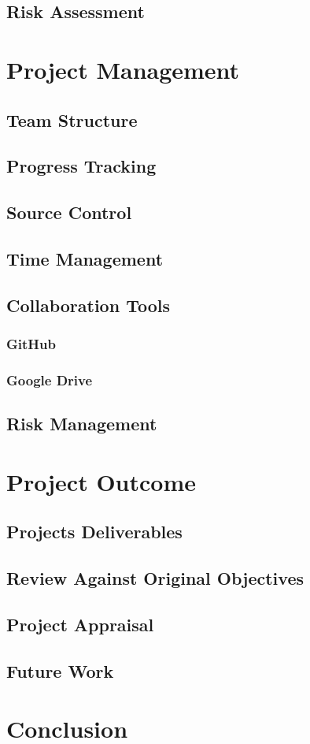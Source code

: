 \documentclass[12pt,a4paper,twoside]{report}
\begin{document}
	\section{Risk Assessment}

\chapter{Project Management}
	\section{Team Structure}
	\section{Progress Tracking}
	\section{Source Control}
	\section{Time Management}
	\section{Collaboration Tools}
		\subsection{GitHub}
		\subsection{Google Drive}
	\section{Risk Management}

\chapter{Project Outcome}
	\section{Projects Deliverables}
	\section{Review Against Original Objectives}
	\section{Project Appraisal}
	\section{Future Work}

\chapter{Conclusion}
\end{document}

